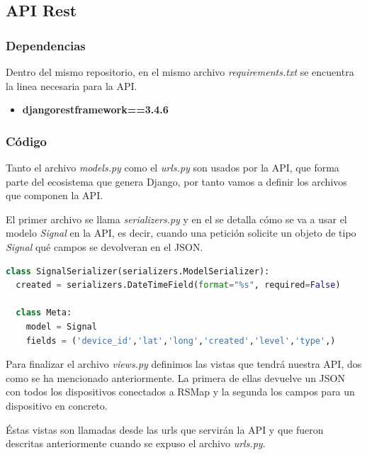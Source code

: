 \newpage

\subsection{API Rest}

\subsubsection{Dependencias}

Dentro del mismo repositorio, en el mismo archivo \textit{requirements.txt} se encuentra la linea necesaria para la API.

\begin{itemize}
	\item \textbf{djangorestframework==3.4.6}
\end{itemize}

\subsubsection{Código}

Tanto el archivo \textit{models.py} como el \textit{urls.py} son usados por la API, que forma parte del ecosistema que genera Django, por tanto vamos a definir los archivos que componen la API.

\bigskip

El primer archivo se llama \textit{serializers.py} y en el se detalla cómo se va a usar el modelo \textit{Signal} en la API, es decir, cuando una petición solicite un objeto de tipo \textit{Signal} qué campos se devolveran en el JSON.

\begin{lstlisting}[language=python,caption={Serializador del modelo Signal},label={lst:pi1}]
class SignalSerializer(serializers.ModelSerializer):
  created = serializers.DateTimeField(format="%s", required=False)

  class Meta:
    model = Signal
    fields = ('device_id','lat','long','created','level','type',)
\end{lstlisting}

\bigskip

Para finalizar el archivo \textit{views.py} definimos las vistas que tendrá nuestra API, dos como se ha mencionado anteriormente. La primera de ellas devuelve un JSON con todos los dispositivos conectados a RSMap y la segunda los campos para un dispositivo en concreto.

Éstas vistas son llamadas desde las urls que servirán la API y que fueron descritas anteriormente cuando se expuso el archivo \textit{urls.py}.

